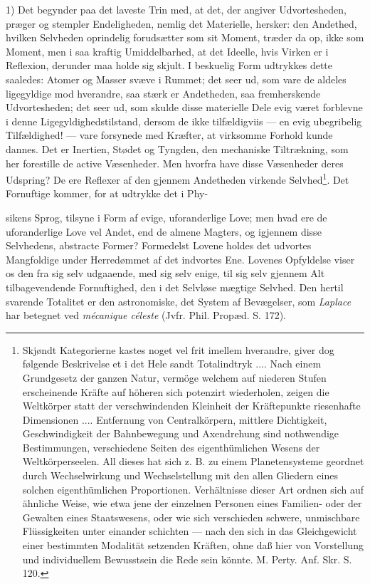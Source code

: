 \documentclass[12pt,a4paper]{book}
\begin{document}
1) Det begynder paa det laveste Trin med, at det, der angiver
Udvortesheden, præger og stempler Endeligheden, nemlig det Materielle,
hersker: den Andethed, hvilken Selvheden oprindelig forudsætter som
sit Moment, træder da op, ikke som Moment, men i saa kraftig
Umiddelbarhed, at det Ideelle, hvis Virken er i Reflexion, derunder maa
holde sig skjult. I beskuelig Form udtrykkes dette saaledes: Atomer og
Masser svæve i Rummet; det seer ud, som vare de aldeles ligegyldige mod
hverandre, saa stærk er Andetheden, saa fremherskende Udvortesheden;
det seer ud, som skulde disse materielle Dele evig været forblevne i
denne Ligegyldighedstilstand, dersom de ikke tilfældigviis --- en evig
ubegribelig Tilfældighed! --- vare forsynede med Kræfter, at virksomme
Forhold kunde dannes. Det er Inertien, Stødet og Tyngden, den
mechaniske Tiltrækning, som her forestille de active Væsenheder. Men
hvorfra have disse Væsenheder deres Udspring? De ere Reflexer af den
gjennem Andetheden virkende Selvhed\footnote{Skjøndt Kategorierne
kastes noget vel frit imellem hverandre, giver dog følgende
Beskrivelse et i det Hele sandt Totalindtryk .... Nach einem
Grundgesetz der ganzen Natur, vermöge welchem auf niederen Stufen
erscheinende Kräfte auf höheren sich potenzirt wiederholen, zeigen die
Weltkörper statt der verschwindenden Kleinheit der Kräftepunkte
riesenhafte Dimensionen .... Entfernung von Centralkörpern, mittlere
Dichtigkeit, Geschwindigkeit der Bahnbewegung und Axendrehung sind
nothwendige Bestimmungen, verschiedene Seiten des eigenthümlichen
Wesens der Weltkörperseelen. All dieses hat sich z. B. zu einem
Planetensysteme geordnet durch Wechselwirkung und Wechselstellung mit
den allen Gliedern eines solchen eigenthümlichen Proportionen.
Verhältnisse dieser Art ordnen sich auf ähnliche Weise, wie etwa jene
der einzelnen Personen eines Familien- oder der Gewalten eines
Staatswesens, oder wie sich verschieden schwere, unmischbare
Flüssigkeiten unter einander schichten --- nach den sich in das
Gleichgewicht einer bestimmten Modalität setzenden Kräften, ohne daß
hier von Vorstellung und individuellem Bewusstsein die Rede sein könnte.
M. Perty. Anf. Skr. S. 120.}. Det Fornuftige kommer, for at udtrykke det i
Phy-

sikens Sprog, tilsyne i Form af evige, uforanderlige Love; men hvad ere
de uforanderlige Love vel Andet, end de almene Magters, og igjennem
disse Selvhedens, abstracte Former? Formedelst Lovene holdes det
udvortes Mangfoldige under Herredømmet af det indvortes Ene. Lovenes
Opfyldelse viser os den fra sig selv udgaaende, med sig selv enige, til
sig selv gjennem Alt tilbagevendende Fornuftighed, den i det Selvløse
mægtige Selvhed. Den hertil svarende Totalitet er den astronomiske, det
System af Bevægelser, som \textit{Laplace} har betegnet ved
\textit{mécanique céleste} (Jvfr. Phil. Propæd. S. 172).
\end{document}
